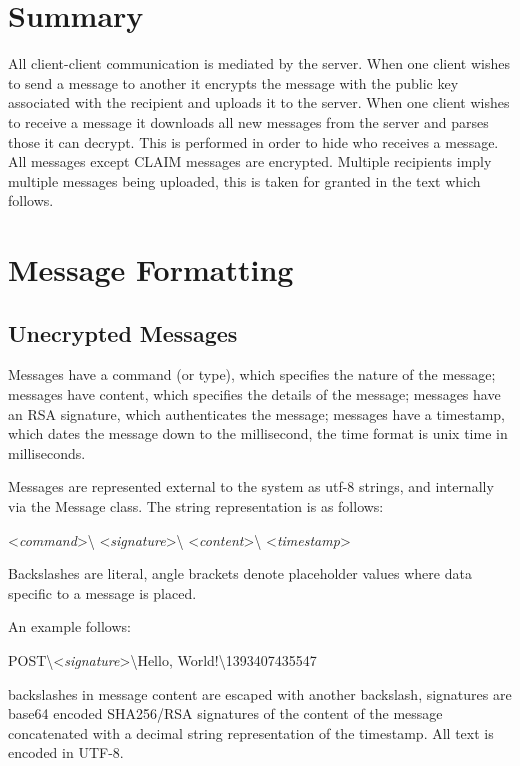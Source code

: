 \section{Summary}
All client-client communication is mediated by the server. When one client
wishes to send a message to another it encrypts the message with the public key
associated with the recipient and uploads it to the server. When one client
wishes to receive a message it downloads all new messages from the server and
parses those it can decrypt. This is performed in order to hide who receives a
message. All messages except CLAIM messages are encrypted. Multiple recipients
imply multiple messages being uploaded, this is taken for granted in the text
which follows.

\section{Message Formatting}
\subsection{Unecrypted Messages}
Messages have a command (or type), which specifies the nature of the message;
messages have content, which specifies the details of the message;
messages have an RSA signature, which authenticates the message;
messages have a timestamp, which dates the message down to the millisecond, the
time format is unix time in milliseconds.

Messages are represented external to the system as utf-8 strings, and internally
via the Message class. The string representation is as follows:\\

\begin{center}
\textless \textit{command}\textgreater\textbackslash
\textless \textit{signature}\textgreater\textbackslash
\textless \textit{content}\textgreater\textbackslash
\textless \textit{timestamp}\textgreater
\end{center}

Backslashes are literal, angle brackets denote placeholder values where data
specific to a message is placed.

An example follows:
\begin{center}
POST\textbackslash\textless\textit{signature}\textgreater\textbackslash Hello, World!\textbackslash 1393407435547
\end{center}

backslashes in message content are escaped with another backslash, signatures
are base64 encoded SHA256/RSA signatures of the content of the message
concatenated with a decimal string representation of the timestamp. All text is
encoded in UTF-8.

